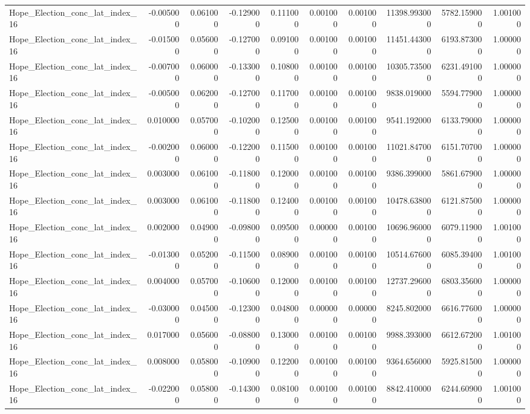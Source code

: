 \begin{table}
\begin{tabular}{lrrrrrrrrr}
Hope_Election_conc_lat_index_16 & -0.005000 & 0.061000 & -0.129000 & 0.111000 & 0.001000 & 0.001000 & 11398.993000 & 5782.159000 & 1.001000 \\
Hope_Election_conc_lat_index_16 & -0.015000 & 0.056000 & -0.127000 & 0.091000 & 0.001000 & 0.001000 & 11451.443000 & 6193.873000 & 1.000000 \\
Hope_Election_conc_lat_index_16 & -0.007000 & 0.060000 & -0.133000 & 0.108000 & 0.001000 & 0.001000 & 10305.735000 & 6231.491000 & 1.000000 \\
Hope_Election_conc_lat_index_16 & -0.005000 & 0.062000 & -0.127000 & 0.117000 & 0.001000 & 0.001000 & 9838.019000 & 5594.779000 & 1.000000 \\
Hope_Election_conc_lat_index_16 & 0.010000 & 0.057000 & -0.102000 & 0.125000 & 0.001000 & 0.001000 & 9541.192000 & 6133.790000 & 1.000000 \\
Hope_Election_conc_lat_index_16 & -0.002000 & 0.060000 & -0.122000 & 0.115000 & 0.001000 & 0.001000 & 11021.847000 & 6151.707000 & 1.000000 \\
Hope_Election_conc_lat_index_16 & 0.003000 & 0.061000 & -0.118000 & 0.120000 & 0.001000 & 0.001000 & 9386.399000 & 5861.679000 & 1.000000 \\
Hope_Election_conc_lat_index_16 & 0.003000 & 0.061000 & -0.118000 & 0.124000 & 0.001000 & 0.001000 & 10478.638000 & 6121.875000 & 1.000000 \\
Hope_Election_conc_lat_index_16 & 0.002000 & 0.049000 & -0.098000 & 0.095000 & 0.000000 & 0.001000 & 10696.960000 & 6079.119000 & 1.001000 \\
Hope_Election_conc_lat_index_16 & -0.013000 & 0.052000 & -0.115000 & 0.089000 & 0.001000 & 0.001000 & 10514.676000 & 6085.394000 & 1.001000 \\
Hope_Election_conc_lat_index_16 & 0.004000 & 0.057000 & -0.106000 & 0.120000 & 0.001000 & 0.001000 & 12737.296000 & 6803.356000 & 1.000000 \\
Hope_Election_conc_lat_index_16 & -0.030000 & 0.045000 & -0.123000 & 0.048000 & 0.000000 & 0.000000 & 8245.802000 & 6616.776000 & 1.000000 \\
Hope_Election_conc_lat_index_16 & 0.017000 & 0.056000 & -0.088000 & 0.130000 & 0.001000 & 0.001000 & 9988.393000 & 6612.672000 & 1.001000 \\
Hope_Election_conc_lat_index_16 & 0.008000 & 0.058000 & -0.109000 & 0.122000 & 0.001000 & 0.001000 & 9364.656000 & 5925.815000 & 1.000000 \\
Hope_Election_conc_lat_index_16 & -0.022000 & 0.058000 & -0.143000 & 0.081000 & 0.001000 & 0.001000 & 8842.410000 & 6244.609000 & 1.001000 \\

\end{tabular}
\end{table}
